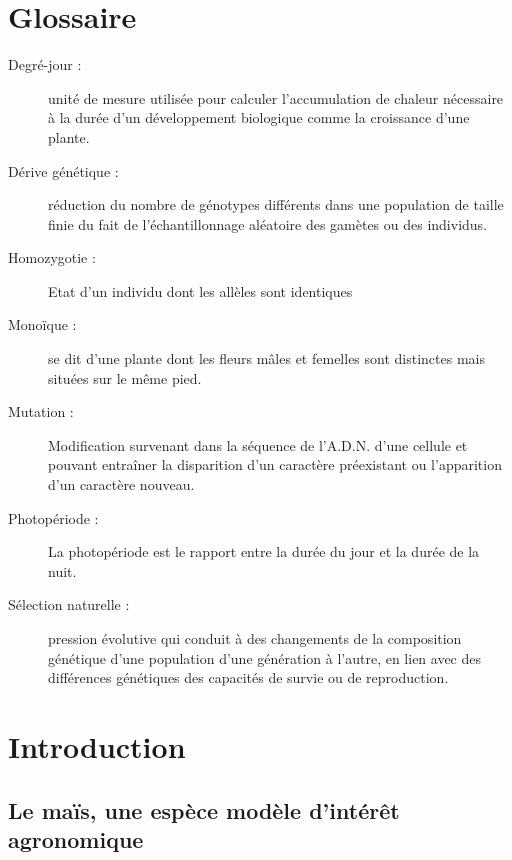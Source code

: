 \documentclass[12pt,a4paper]{article}
\begin{document}
	
	\tableofcontents
	\newpage
	
		\section*{Glossaire}
			\begin{description}
				
				\item [Degré-jour :] unité de mesure utilisée pour calculer l'accumulation de chaleur nécessaire à la durée d'un développement biologique comme la croissance d'une plante.
				
				\item [Dérive génétique :] réduction du nombre de génotypes différents dans une population de taille finie du fait de l'échantillonnage aléatoire des gamètes ou des individus.
				
				\item [Homozygotie :] Etat d'un individu dont les allèles sont identiques
				
				\item [Monoïque :] se dit d'une plante dont les fleurs mâles et femelles sont distinctes mais situées sur le même pied.
				
				\item [Mutation :] Modification survenant dans la séquence de l'A.D.N. d'une cellule et pouvant entraîner la disparition d'un caractère préexistant ou l'apparition d'un caractère nouveau.
				
				\item [Photopériode :] La photopériode est le rapport entre la durée du jour et la durée de la nuit.
				
				\item [Sélection naturelle :] pression évolutive qui conduit à des changements de la composition génétique d'une population d'une génération à l'autre, en lien avec des différences génétiques des capacités de survie ou de reproduction.
				
			
				
			\end{description}
			
			\newpage
			
		\section{Introduction}
				\subsection{Le maïs, une espèce modèle d'intérêt agronomique}
\end{document}
